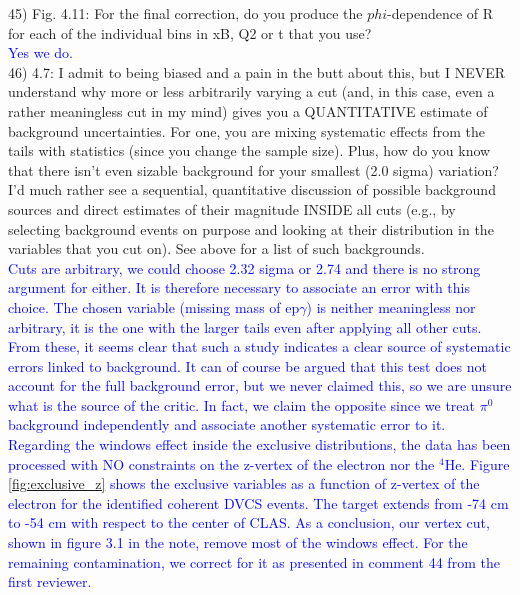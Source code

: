 45) Fig. 4.11: For the final correction, do you produce the $phi$-dependence of R 
for each of the individual bins in xB, Q2 or t that you use? \\
 \textcolor{blue}{Yes we do.}\\

46) 4.7: I admit to being biased and a pain in the butt about this, but I NEVER 
understand why more or less arbitrarily varying a cut (and, in this case, even 
a rather meaningless cut in my mind) gives you a QUANTITATIVE estimate of 
background uncertainties. For one, you are mixing systematic effects from the 
tails with statistics (since you change the sample size). Plus, how do you know 
that there isn't even sizable background for your smallest (2.0 sigma) 
variation? I'd much rather see a sequential, quantitative discussion of 
possible background sources and direct estimates of their magnitude INSIDE all 
cuts (e.g., by selecting background events on purpose and looking at their 
distribution in the variables that you cut on). See above for a list of such 
backgrounds.\\
 \textcolor{blue}{Cuts are arbitrary, we could choose 2.32 sigma or 2.74 and 
there is no strong argument for either. It is therefore necessary to associate
an error with this choice. The chosen variable (missing mass of ep$\gamma$) is 
neither meaningless nor arbitrary, it is the one with the larger tails even 
after applying all other cuts. From these, it seems clear that such a study 
indicates a clear source of systematic errors linked to background. It can of 
course be argued that this test does not account for the full background error, 
but we never claimed this, so we are unsure what is the source of the critic. In 
fact, we claim the opposite since we treat $\pi^0$ background independently and 
associate another systematic error to it.}\\

 \textcolor{blue}{ Regarding the windows effect inside the exclusive 
    distributions, the data has been processed with NO constraints on the 
    z-vertex of the electron nor the $^{4}$He. Figure \ref{fig:exclusive_z} 
    shows the exclusive variables as a function of z-vertex of the electron for 
 the identified coherent DVCS events. The target extends from -74 cm to -54 cm 
 with respect to the center of CLAS. As a conclusion, our vertex cut, shown in 
 figure 3.1 in the note, remove most of the windows effect. For the remaining 
 contamination, we correct for it as presented in comment 44 from the first 
 reviewer. }\\

